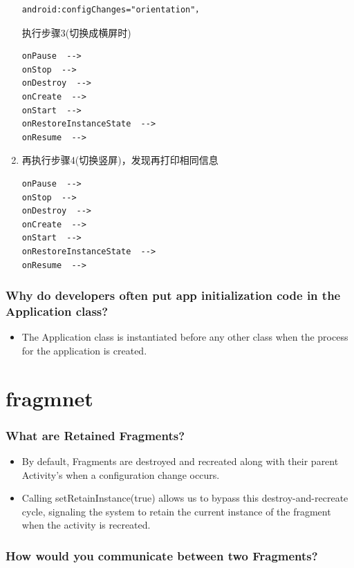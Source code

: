 \documentclass[9pt, b5paaper]{book}
\begin{document}
\begin{enumerate}
\begin{verbatim}
android:configChanges="orientation"，
\end{verbatim}
执行步骤3(切换成横屏时)
\begin{verbatim}
onPause  -->
onStop  -->
onDestroy  -->
onCreate  -->
onStart  -->
onRestoreInstanceState  -->
onResume  -->
\end{verbatim}
\item 再执行步骤4(切换竖屏)，发现再打印相同信息
\label{sec-8-0-1-6}
\begin{verbatim}
onPause  -->
onStop  -->
onDestroy  -->
onCreate  -->
onStart  -->
onRestoreInstanceState  -->
onResume  -->
\end{verbatim}
\end{enumerate}

\subsection{Why do developers often put app initialization code in the Application class?}
\label{sec-8-0-2}
\begin{itemize}
\item The Application class is instantiated before any other class when the process for the application is created.
\end{itemize}

\chapter{fragmnet}
\label{sec-9}
\subsection{What are Retained Fragments?}
\label{sec-9-0-1}
\begin{itemize}
\item By default, Fragments are destroyed and recreated along with their parent Activity’s when a configuration change occurs.
\item Calling setRetainInstance(true) allows us to bypass this destroy-and-recreate cycle, signaling the system to retain the current instance of the fragment when the activity is recreated.
\end{itemize}

\subsection{How would you communicate between two Fragments?}
\label{sec-9-0-2}
\end{document}

